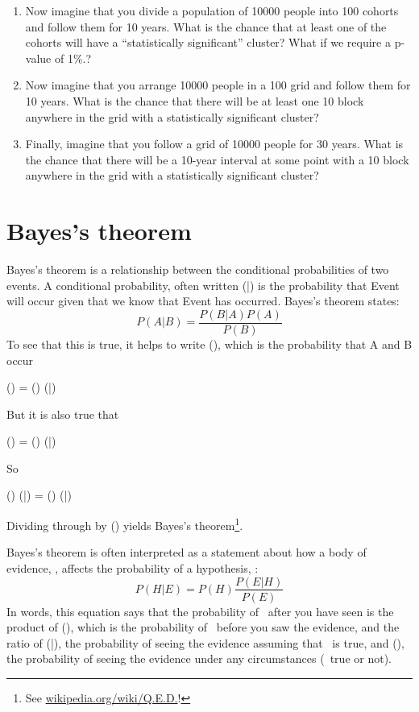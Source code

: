 \documentclass[12pt]{book}
\begin{document}
\begin{exercise}
\begin{enumerate}
\item Now imagine that you divide a population of 10000 people into 100
  cohorts and follow them for 10 years.  What is the chance that at
  least one of the cohorts will have a ``statistically significant''
  cluster?  What if we require a p-value of 1\%.?

\item Now imagine that you arrange 10000 people in a 100 
  grid and follow them for 10 years.  What is the chance that there
  will be at least one 10  block anywhere in the grid
  with a statistically significant cluster?

\item Finally, imagine that you follow a grid of 10000 people for 30
  years.  What is the chance that there will be a 10-year interval
  at some point with a 10  block anywhere in the grid
  with a statistically significant cluster?

\end{enumerate}

\end{exercise}



\section{Bayes's theorem}

Bayes's theorem is a relationship between the conditional probabilities
of two events.  A conditional probability, often written \Prob(\A|\B) is
the probability that Event \A will occur given that we know that
Event \B has occurred.  Bayes's theorem states:
%
\[ P(A|B) = \frac{P(B|A)P(A)}{P(B)} \]
%
To see that this is true, it helps to write \Prob(\A \AND \B), which
is the probability that A and B occur

\quad \Prob(\A \AND \B) = \Prob(\A) \Prob(\B|\A)

But it is also true that 

\quad \Prob(\A \AND \B) = \Prob(\B) \Prob(\A|\B) 

So

\quad \Prob(\B) \Prob(\A|\B) = \Prob(\A) \Prob(\B|\A) 

Dividing through by \Prob(\B) yields Bayes's theorem\footnote{See
\url{wikipedia.org/wiki/Q.E.D.}!}.

Bayes's theorem is often interpreted as a statement about 
how a body of evidence, \E, affects the probability of a 
hypothesis, \HH:
%
\[ P(H|E) = P(H) \frac{P(E|H)}{P(E)} \]
%
In words, this equation says that the probability of \HH~after you
have seen \E is the product of \Prob(\HH), which is the probability of
\HH~before you saw the evidence, and the ratio of \Prob(\E|\HH), the
probability of seeing the evidence assuming that \HH~is true, and
\Prob(\E), the probability of seeing the evidence under any circumstances
(\HH~true or not).
\end{document}
